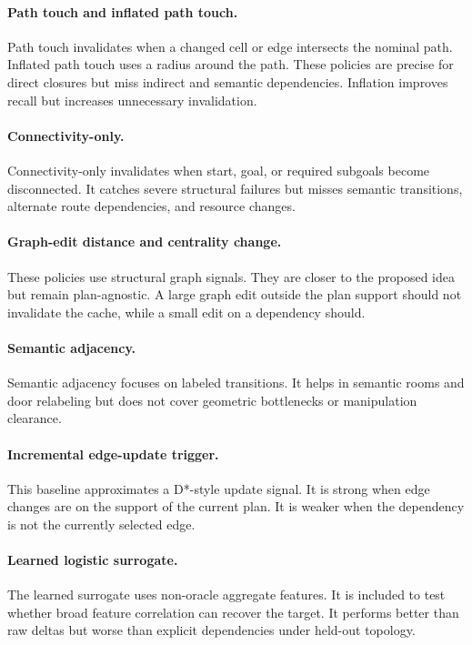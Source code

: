 \documentclass{article}
\begin{document}
\paragraph{Path touch and inflated path touch.}
Path touch invalidates when a changed cell or edge intersects the nominal path. Inflated path touch uses a radius around the path. These policies are precise for direct closures but miss indirect and semantic dependencies. Inflation improves recall but increases unnecessary invalidation.

\paragraph{Connectivity-only.}
Connectivity-only invalidates when start, goal, or required subgoals become disconnected. It catches severe structural failures but misses semantic transitions, alternate route dependencies, and resource changes.

\paragraph{Graph-edit distance and centrality change.}
These policies use structural graph signals. They are closer to the proposed idea but remain plan-agnostic. A large graph edit outside the plan support should not invalidate the cache, while a small edit on a dependency should.

\paragraph{Semantic adjacency.}
Semantic adjacency focuses on labeled transitions. It helps in semantic rooms and door relabeling but does not cover geometric bottlenecks or manipulation clearance.

\paragraph{Incremental edge-update trigger.}
This baseline approximates a D*-style update signal. It is strong when edge changes are on the support of the current plan. It is weaker when the dependency is not the currently selected edge.

\paragraph{Learned logistic surrogate.}
The learned surrogate uses non-oracle aggregate features. It is included to test whether broad feature correlation can recover the target. It performs better than raw deltas but worse than explicit dependencies under held-out topology.
\end{document}
